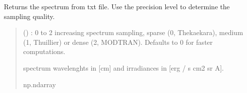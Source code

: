 \documentclass[letterpaper,10pt,english]{sphinxmanual}
\begin{document}
\begin{fulllineitems}
\label{\detokenize{doppler_dimming_lib.spectra:doppler_dimming_lib.spectra.spectra.get_spectrum_from_txt}}
\pysigstartsignatures
{}
\pysigstopsignatures
\sphinxAtStartPar
Returns the spectrum from txt file. Use the precision level
to determine the sampling quality.
\begin{quote}\begin{description}
\sphinxAtStartPar
{} (\sphinxstyleliteralemphasis{\sphinxupquote{, }}) \textendash{} : 0 to 2 increasing spectrum sampling, sparse (0, Thekaekara), medium (1, Thuillier) or dense (2, MODTRAN). Defaults to 0 for faster computations.

\sphinxAtStartPar
spectrum wavelenghts in {[}cm{]} and irradiances in {[}erg / s cm2 sr A{]}.

\sphinxAtStartPar
np.ndarray

\end{description}\end{quote}

\end{fulllineitems}

\end{document}
